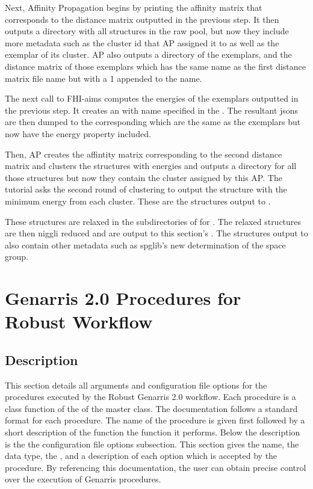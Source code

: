 \documentclass[letterpaper,10pt,english]{sphinxmanual}
\begin{document}
Next, Affinity Propagation begins by printing the affinity matrix that
corresponds to the distance matrix outputted in the previous step.
It then outputs a directory with all structures in the raw pool, but now they
include more metadata such as the cluster id that AP assigned
it to as well as the exemplar of its cluster. AP also outputs a directory of
the exemplars, and the distance matrix of those exemplars which has
the same name as the first distance matrix file name but with a 1 appended
to the name.

The next call to FHI-aims computes the energies of the exemplars outputted in
the previous step. It creates an  with name specified in
the . The resultant jsons are then dumped to the corresponding
 which are the same as the exemplars but now have the energy
property included.

Then, AP creates the affintity matrix corresponding to the second distance
matrix and clusters the structures with energies and outputs a directory
for all those structures but now they contain the cluster assigned by this AP.
The tutorial asks the second round of clustering to output the
structure with the minimum energy from each cluster. These are the structures
output to .

These structures are relaxed in the subdirectories of  for
. The relaxed structures are then niggli reduced and are
output to this section's . The structures output to 
also contain other metadata such as spglib's new determination of the space
group.


\chapter{Genarris 2.0 Procedures for Robust Workflow}
\label{\detokenize{index:genarris-2-0-procedures-for-robust-workflow}}\label{\detokenize{index:documentation}}

\section{Description}
\label{\detokenize{index:description}}
This section details all arguments and configuration file
options for the procedures executed by the Robust Genarris 2.0 workflow. Each
procedure is a class function of the of the  master class.
The documentation follows a standard format for each procedure. The name
of the procedure is given first followed by a short description of the function
the function it performs. Below the description is the the configuration file
options subsection. This section gives the name, the data type,
the {\hyperref[\detokenize{index:category}]{}}, and a description of each option which is accepted by the
procedure. By referencing this documentation, the user can obtain precise
control over the execution of Genarris procedures.
\end{document}
